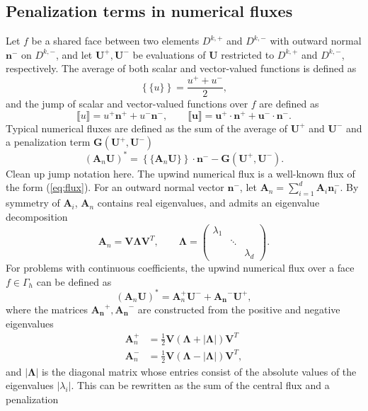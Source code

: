 \documentclass[10pt]{article}
\newcommand{\LRp}[1]{\left( #1 \right)}
\newcommand{\LRb}[1]{\left| #1 \right|}
\newcommand{\LRc}[1]{\left\{ #1 \right\}}
\newcommand{\jump}[1] {\ensuremath{\llbracket#1\rrbracket}}
\newcommand{\avg}[1] {\ensuremath{\LRc{\!\{#1\}\!}}}
\newcommand{\Gh}{\Gamma_h}
\newcommand{\note}[1]{{\color{blue}#1}}
\begin{document}

\subsection{Penalization terms in numerical fluxes}

Let $f$ be a shared face between two elements $D^{k,+}$ and $D^{k,-}$ with outward normal $\bm{n}^-$ on $D^{k,-}$, and let $\bm{U}^+, \bm{U}^-$ be evaluations of $\bm{U}$ restricted to $D^{k,+}$ and $D^{k,-}$, respectively.  The average of both scalar and vector-valued functions is defined as
\[
\avg{u} = \frac{{u}^+ + u^-}{2},
\]
and the jump of scalar and vector-valued functions over $f$ are defined as
\[
\jump{u} = u^+ \bm{n}^+ + u^-\bm{n}^-, \qquad \jump{\bm{u}} = \bm{u}^+\cdot \bm{n}^+ + \bm{u}^-\cdot\bm{n}^-.  
\]
Typical numerical fluxes are defined as the sum of the average of $\bm{U}^+$ and $\bm{U}^-$ and a penalization term $\bm{G(\bm{U}^+,\bm{U}^-)}$
\begin{equation}
(\bm{A}_n\bm{U})^* = \avg{\bm{A}_n\bm{U}}\cdot \bm{n}^- - \bm{G(\bm{U}^+,\bm{U}^-)}.
\label{eq:flux}
\end{equation}
\note{Clean up jump notation here.}
The upwind numerical flux is a well-known flux of the form (\ref{eq:flux}).  For an outward normal vector $\bm{n}^-$, let ${\bm{A}}_n = \sum_{i=1}^d {\bm{A}_i\bm{n}^-_i}$.  By symmetry of $\bm{A}_i$, ${\bm{A}}_n$ contains real eigenvalues, and admits an eigenvalue decomposition
\[
\bm{A}_n = \bm{V}{\bm{\Lambda}}\bm{V}^T, \qquad \bm{\Lambda} = 
\left(\begin{array}{ccc}
\lambda_1 & & \\
& \ddots & \\
& & \lambda_d
\end{array}\right).
\]
For problems with continuous coefficients, the upwind numerical flux over a face $f \in \Gh$ can be defined  as
\[
(\bm{A}_n\bm{U})^* = \bm{A}_n^+\bm{U}^- + \bm{A_n}^- \bm{U}^+,
\]
where the matrices $\bm{A_n}^+,\bm{A_n}^-$ are constructed from the positive and negative eigenvalues 
\begin{align*}
\bm{A}_n^+ &= \frac{1}{2}\bm{V} \LRp{\bm{\Lambda} + \LRb{\bm{\Lambda}}} \bm{V}^T\\
\bm{A}_n^- &= \frac{1}{2}\bm{V} \LRp{\bm{\Lambda} - \LRb{\bm{\Lambda}}} \bm{V}^T,
\end{align*}
and $\LRb{\bm{\Lambda}}$ is the diagonal matrix whose entries consist of the absolute values of the eigenvalues $\LRb{\lambda_i}$.  This can be rewritten as the sum of the central flux and a penalization
\end{document}

